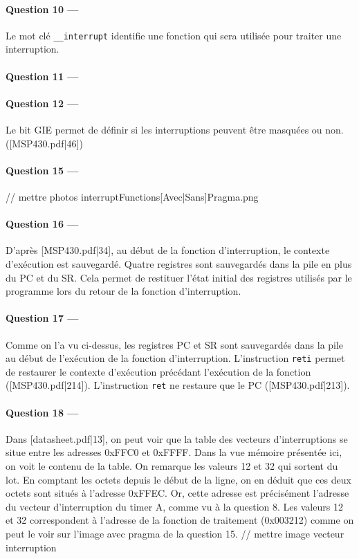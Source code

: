 \documentclass[a4paper,11pt,article]{memoir}
\begin{document}
\paragraph{Question 10 ---}  Le mot clé \verb|__interrupt| identifie une fonction qui sera utilisée pour traiter une interruption.

\paragraph{Question 11 ---}  

\paragraph{Question 12 ---}  Le bit GIE permet de définir si les interruptions peuvent être masquées ou non. ([MSP430.pdf|46])

\paragraph{Question 15 ---}  // mettre photos interruptFunctions[Avec|Sans]Pragma.png

\paragraph{Question 16 ---}  D'après [MSP430.pdf|34], au début de la fonction d'interruption, le contexte d'exécution est sauvegardé. Quatre registres sont sauvegardés dans la pile en plus du PC et du SR. Cela permet de restituer l'état initial des registres utilisés par le programme lors du retour de la fonction d'interruption.

\paragraph{Question 17 ---}  Comme on l'a vu ci-dessus, les registres PC et SR sont sauvegardés dans la pile au début de l'exécution de la fonction d'interruption. L'instruction \verb|reti| permet de restaurer le contexte d'exécution précédant l'exécution de la fonction ([MSP430.pdf|214]). L'instruction \verb|ret| ne restaure que le PC ([MSP430.pdf|213]).

\paragraph{Question 18 ---}  Dans [datasheet.pdf|13], on peut voir que la table des vecteurs d'interruptions se situe entre les adresses 0xFFC0 et 0xFFFF. Dans la vue mémoire présentée ici, on voit le contenu de la table. On remarque les valeurs 12 et 32 qui sortent du lot. En comptant les octets depuis le début de la ligne, on en déduit que ces deux octets sont situés à l'adresse 0xFFEC.
Or, cette adresse est précisément l'adresse du vecteur d'interruption du timer A, comme vu à la question 8. Les valeurs 12 et 32 correspondent à l'adresse de la fonction de traitement (0x003212) comme on peut le voir sur l'image avec pragma de la question 15.
// mettre image vecteur interruption
\end{document}
